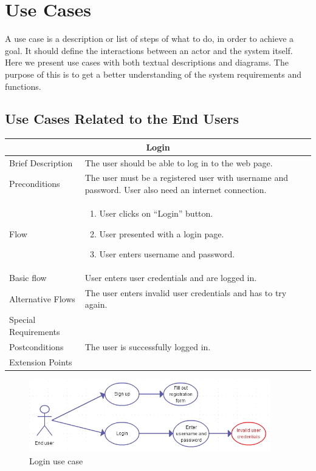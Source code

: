 \section{Use Cases}
\label{sec:SysReqUseCases}

A use case is a description or list of steps of what to do, in order to achieve a goal. It should define the interactions between an actor and the system itself. Here we present use cases with both textual descriptions and diagrams. The purpose of this is to get a better understanding of the system requirements and functions.

\subsection{Use Cases Related to the End Users}

\begin{minipage}{\linewidth}
\begin{tabular}{|l|p{85mm}|}
  \hline
  \multicolumn{2}{|c|}{\cellcolor{gray!25} \textbf{Login}} \\
  \hline
  Brief Description & The user should be able to log in to the web page.\\
  Preconditions & The user must be a registered user with username and password. User also need an internet connection.\\
  Flow &
    \begin{enumerate}
      \item User clicks on “Login” button.
      \item User presented with a login page.
      \item User enters username and password.
    \end{enumerate} \\
  Basic flow & User enters user credentials and are logged in.\\
  Alternative Flows & The user enters invalid user credentials and has to try again.\\
  Special Requirements & \\
  Postconditions & The user is successfully logged in.\\
  Extension Points & \\
  \hline
\end{tabular}
\end{minipage}

\begin{figure}[ht!]
\centering
\includegraphics[width=105mm]{./SystemRequirements/img/loginUC.png}
\caption{Login use case \label{fig:SysReqUseCasesLogin}}
\end{figure}

